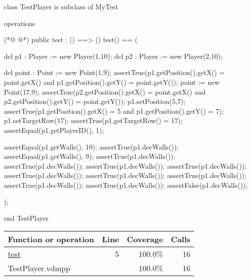 \begin{vdmpp}[breaklines=true]
class TestPlayer is subclass of MyTest

operations

(*@
\label{test:5}
@*)
 public test : () ==> ()
 test() == 
 (
 
  dcl p1 : Player := new Player(1,10);
  dcl p2 : Player := new Player(2,10);
  
  dcl point : Point := new Point(1,9);
  assertTrue(p1.getPosition().getX() = point.getX() and p1.getPosition().getY() = point.getY());
  point := new Point(17,9);
  assertTrue(p2.getPosition().getX() = point.getX() and p2.getPosition().getY() = point.getY());
  p1.setPosition(5,7);
  assertTrue(p1.getPosition().getX() = 5 and p1.getPosition().getY() = 7);
  p1.setTargetRow(17);
  assertTrue(p1.getTargetRow() = 17);
  assertEqual(p1.getPlayerID(), 1);
  
  assertEqual(p1.getWalls(), 10);
  assertTrue(p1.decWalls());
  assertEqual(p1.getWalls(), 9);
  assertTrue(p1.decWalls());
  assertTrue(p1.decWalls());
  assertTrue(p1.decWalls());
  assertTrue(p1.decWalls());
  assertTrue(p1.decWalls());
  assertTrue(p1.decWalls());
  assertTrue(p1.decWalls());
  assertTrue(p1.decWalls());
  assertTrue(p1.decWalls());
  assertFalse(p1.decWalls());
  
 );

end TestPlayer
\end{vdmpp}
\bigskip
\begin{longtable}{|l|r|r|r|}
\hline
Function or operation & Line & Coverage & Calls \\
\hline
\hline
\hyperref[test:5]{test} & 5&100.0\% & 16 \\
\hline
\hline
TestPlayer.vdmpp & & 100.0\% & 16 \\
\hline
\end{longtable}

